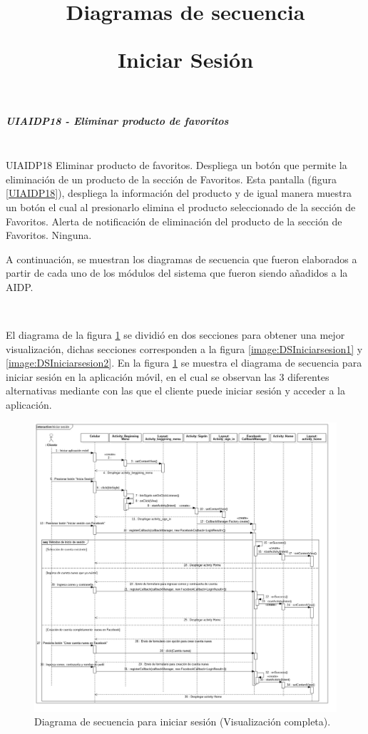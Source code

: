 \subparagraph{UIAIDP18 - Eliminar producto de favoritos} ~\\
\FloatBarrier
{} %
{UIAIDP18} %
{Eliminar producto de favoritos.}  %
{Despliega un botón que permite la eliminación de un producto de la sección de Favoritos.} %
{Esta pantalla (figura \ref{UIAIDP18}), despliega la información del producto y de igual manera muestra un botón el cual al presionarlo elimina el producto seleccionado de la sección de Favoritos.} %
{Alerta de notificación de eliminación del producto de la sección de Favoritos.} %
{Ninguna.} %
\FloatBarrier





A continuación, se muestran los diagramas de secuencia que fueron elaborados a partir de cada uno de los módulos del sistema que fueron siendo añadidos a la AIDP. \\ \par
\title{\textbf{Diagramas de secuencia}\\ \par}
\title{\textbf{Iniciar Sesión}}
\\ \par El diagrama de la figura \ref{image:DSIniciarsesion} se dividió en dos secciones para obtener una mejor visualización, dichas secciones corresponden a la figura \ref{image:DSIniciarsesion1} y \ref{image:DSIniciarsesion2}.
En la figura \ref{image:DSIniciarsesion} se muestra el diagrama de secuencia para iniciar sesión en la aplicación móvil, en el cual se observan las 3 diferentes alternativas mediante con las que el cliente puede iniciar sesión y acceder a la aplicación.


\FloatBarrier
\begin{figure}[htbp!]
		\centering
			\includegraphics[width=0.9 \textwidth]{imagenes/Diagramas_UserApp/Nuevos_diagramas/IniciarSesion}
		\caption{Diagrama de secuencia para iniciar sesión (Visualización completa).}
		\label{image:DSIniciarsesion}
\end{figure}
\FloatBarrier


